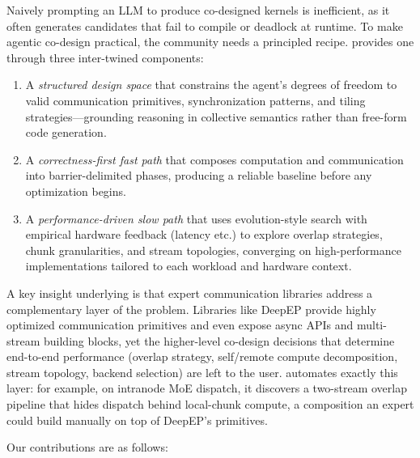 Naively prompting an LLM to produce co-designed kernels is inefficient, as it often generates candidates that fail to compile or deadlock at runtime. To make agentic co-design practical, the community needs a principled recipe. \cufuse{} provides one through three inter-twined components:
\begin{enumerate}[leftmargin=1.4em,itemsep=1pt,topsep=2pt]
  \item A \emph{structured design space} that constrains the agent's degrees of freedom to valid communication primitives, synchronization patterns, and tiling strategies---grounding reasoning in collective semantics rather than free-form code generation.
  \item A \emph{correctness-first fast path} that composes computation and communication into barrier-delimited phases, producing a reliable baseline before any optimization begins.
  \item A \emph{performance-driven slow path} that uses evolution-style search with empirical hardware feedback (latency etc.) to explore overlap strategies, chunk granularities, and stream topologies, converging on high-performance implementations tailored to each workload and hardware context.
\end{enumerate}

\vspace{-4pt}
A key insight underlying \cufuse{} is that expert communication libraries address a complementary layer of the problem. Libraries like DeepEP provide highly optimized communication primitives and even expose async APIs and multi-stream building blocks, yet the higher-level co-design decisions that determine end-to-end performance (overlap strategy, self/remote compute decomposition, stream topology, backend selection) are left to the user. \cufuse{} automates exactly this layer: for example, on intranode MoE dispatch, it discovers a two-stream overlap pipeline that hides dispatch behind local-chunk compute, a composition an expert could build manually on top of DeepEP's primitives.

Our contributions are as follows:
\vspace{-4pt}

